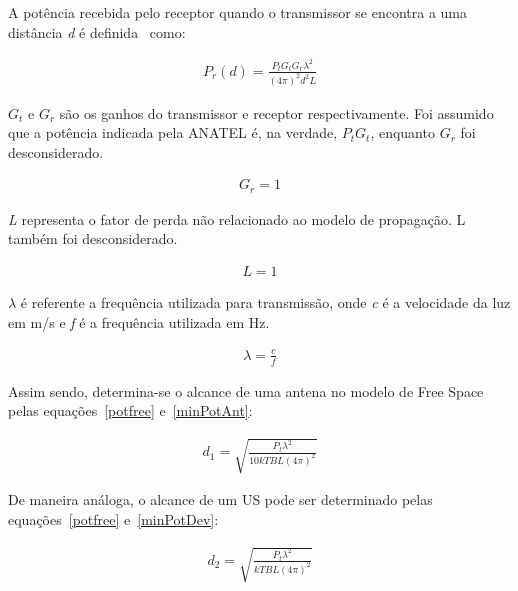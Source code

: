 A potência recebida pelo receptor quando o transmissor se encontra a uma distância \textit{d} é definida~\cite{rapapport} como: 

\begin{align}
  \label{potfree} P_r(d) =\frac{ P_tG_tG_r\lambda^{2}}{(4\pi)^{2}d^{2}L}
\end{align}

\begin{math}G_t\end{math} e \begin{math}G_r\end{math} são os ganhos do transmissor e receptor respectivamente. Foi assumido que a potência indicada pela ANATEL é, na verdade, \begin{math}P_tG_t\end{math}, enquanto \begin{math}G_r\end{math} foi desconsiderado.

\begin{align}
  \label{ganho} G_r = 1
\end{align}

\textit{L} representa o fator de perda não relacionado ao modelo de propagação. L também foi desconsiderado.

\begin{align}
  \label{loss} L = 1
\end{align}

\begin{math}\lambda\end{math} é referente a frequência utilizada para transmissão, onde \textit{c} é a velocidade da luz em m/s e \textit{f} é a frequência utilizada em Hz.

\begin{align}
  \label{lambda}\lambda=\frac{c}{f}
\end{align}

Assim sendo, determina-se o alcance de uma antena no modelo de Free Space pelas equações~\ref{potfree} e~\ref{minPotAnt}:

\begin{align}
  \label{dFreeAnt} d_1 = \sqrt{\frac{P_t\lambda^{2}}{10kTBL(4\pi)^{2}}}
\end{align}

De maneira análoga, o alcance de um US pode ser determinado pelas equações~\ref{potfree} e~\ref{minPotDev}:

\begin{align}
  \label{dFreeDev} d_2 = \sqrt{\frac{P_t\lambda^{2}}{kTBL(4\pi)^{2}}}
\end{align}

